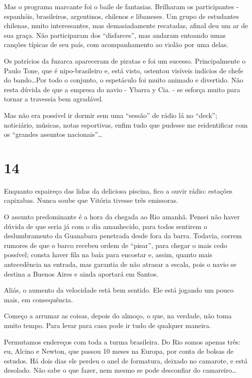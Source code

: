 Mas o programa marcante foi o baile de fantasias. Brilharam os participantes - espanhóis, brasileiros, argentinos, chilenos e libaneses. Um grupo de estudantes chilenas, muito interessantes, mas demasiadamente recatadas, afinal deu um ar de sua graça. Não participaram dos ``disfarces'', mas andaram entoando umas canções típicas de seu país, com acompanhamento ao violão por uma delas.

Os patrícios da fuzarca apareceram de piratas e foi um sucesso. Principalmente o Paulo Tone, que é nipo-brasileiro e, está visto, ostentou visíveis indícios de chefe do bando\ldots Por todo o conjunto, o espetáculo foi muito animado e divertido. Não resta dúvida de que a empresa do navio - Ybarra y Cia. - se esforça muito para tornar a travessia bem agradável.

Mas não era possível ir dormir sem uma ``sessão'' de rádio lá no ``deck''; noticiário, músicas, notas esportivas, enfim tudo que pudesse me reidentificar com os ``grandes assuntos nacionais''\ldots

\section*{14 \adfflatleafright {}}
Enquanto espaireço das lidas da deliciosa piscina, fico a ouvir rádio: estações capixabas. Nunca soube que Vitória tivesse três emissoras.

O assunto predominante é a hora da chegada ao Rio amanhã. Pensei não haver dúvida de que seria já com o dia amanhecido, para todos sentirem o deslumbramento da Guanabara penetrada desde fora da barra. Todavia, correm rumores de que o barco recebeu ordem de ``pisar'', para chegar o mais cedo possível; consta haver fila na baía para encostar e, assim, quanto mais antecedência na entrada, mas garantia de não atrasar a escala, pois o navio se destina a Buenos Aires e ainda aportará em Santos.

Aliás, o aumento da velocidade está bem sentido. Ele está jogando um pouco mais, em consequência.

Começo a arrumar as coisas, depois do almoço, o que, na verdade, não toma muito tempo. Para levar para casa pode ir tudo de qualquer maneira.

Permutamos endereços com toda a turma brasileira. Do Rio somos apenas três: eu, Alcino e Newton, que passou 10 meses na Europa, por conta de bolsas de estudos. Há dois dias ele perdeu o anel de formatura, deixado no camarote, e está desolado. Não sabe o que fazer, nem mesmo se pode desconfiar do camareiro\ldots

